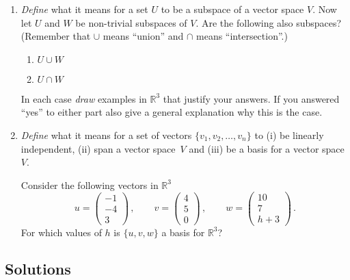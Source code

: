 \begin{enumerate}
\item
{\it Define} what it means for a set $U$ to be a subspace of a vector space $V$.
Now let $U$ and $W$ be non-trivial subspaces of $V$. Are the following also subspaces? (Remember that $\cup$ means ``union'' and $\cap$ means ``intersection''.)
\begin{enumerate}
\item $U \cup  W$
\item $U \cap W$ 
\end{enumerate}
In each case {\it draw} examples in $\mathbb R^3$ that justify your answers. If you answered ``yes'' to either part also give a general 
explanation why this is the case.

\item
{\it Define} what it means for a set of vectors $\{v_1,v_2,\ldots,v_n\}$ to (i) be linearly independent, (ii)
  span a vector space~$V$ and (iii)
 be a basis for a vector space~$V$.

Consider the following vectors in $\mathbb R^3$
\[ u =\begin{pmatrix} -1\\ -4\\ 3 \end{pmatrix}\, ,\qquad
     v =\begin{pmatrix} 4\\ 5\\ 0 \end{pmatrix}\, ,\qquad
    w =\begin{pmatrix} 10\\ 7\\ h+3 \end{pmatrix}\, .
\]
For which values of $h$ is $\{u,v,w\}$ a basis for $\mathbb R^3$?



 \end{enumerate}

\subsection*{Solutions}


